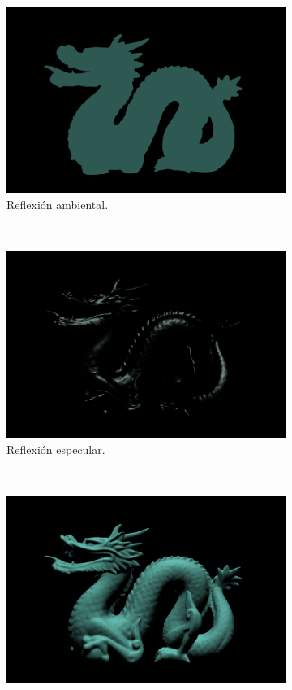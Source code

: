 \begin{enumerate}
\begin{figure}[htp]
 \centering
 \begin{subfigure}[b]{0.2\textwidth}
   \includegraphics[width=\textwidth]{img/ambiente}
   \caption{Reflexión ambiental.}
 \label{fig:2a}
 \end{subfigure}
~
 \begin{subfigure}[b]{0.2\textwidth}
   \includegraphics[width=\textwidth]{img/especular}
   \caption{Reflexión especular.}
   \label{fig:2b}
 \end{subfigure}
~
 \begin{subfigure}[b]{0.2\textwidth}
   \includegraphics[width=\textwidth]{img/difuso}

\end{subfigure}
\end{figure}
\end{enumerate}
